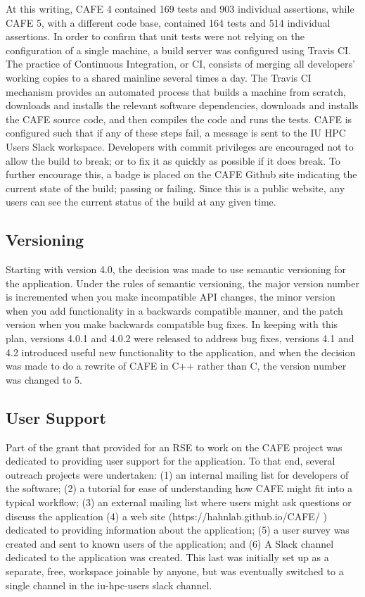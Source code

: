 \documentclass[acmtog, authorversion]{acmart}
\begin{document}
At this writing, CAFE 4 contained 169 tests and 903 individual assertions, while CAFE 5, with a different code base, contained 164 tests and 514 individual assertions. In order to confirm that unit tests were not relying on the configuration of a single machine, a build server was configured using Travis CI. The practice of Continuous Integration, or CI, consists of merging all developers' working copies to a shared mainline several times a day. The Travis CI mechanism provides an automated process that builds a machine from scratch, downloads and installs the relevant software dependencies, downloads and installs the CAFE source code, and then compiles the code and runs the tests. CAFE is configured such that if any of these steps fail, a message is sent to the IU HPC Users Slack workspace. Developers with commit privileges are encouraged not to allow the build to break; or to fix it as quickly as possible if it does break. To further encourage this, a badge is placed on the CAFE Github site indicating the current state of the build; passing or failing. Since this is a public website, any users can see the current status of the build at any given time.

\subsection{Versioning}
    Starting with version 4.0, the decision was made to use semantic versioning for the application. Under the rules of semantic versioning, the major version number is incremented when you make incompatible API changes, the minor version when you add functionality in a backwards compatible manner, and the patch version when you make backwards compatible bug fixes. In keeping with this plan, versions 4.0.1 and 4.0.2 were released to address bug fixes, versions 4.1 and 4.2 introduced useful new functionality to the application, and when the decision was made to do a rewrite of CAFE in C++ rather than C, the version number was changed to 5.

\subsection{User Support}
    Part of the grant that provided for an RSE to work on the CAFE project was dedicated to providing user support for the application. To that end, several outreach projects were undertaken: (1) an internal mailing list for developers of the software; (2) a tutorial for ease of understanding how CAFE might fit into a typical workflow; (3) an external mailing list where users might ask questions or discuss the application (4) a web site (https://hahnlab.github.io/CAFE/ ) dedicated to providing information about the application; (5) a user survey was created and sent to known users of the application; and (6) A Slack channel dedicated to the application was created. This last was initially set up as a separate, free, workspace joinable by anyone, but was eventually switched to a single channel in the iu-hpc-users slack channel. 
    
\end{document}
